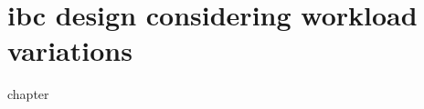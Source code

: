 \chapter{\texorpdfstring{\Gls{ibc}}{IBC} design considering workload variations}
\label{chap:workloadVariations}
\glsresetall
{chapter}

